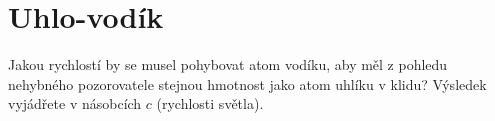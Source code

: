 \documentclass[crop=false]{standalone}
\begin{document}
\section*{Uhlo-vodík}
Jakou rychlostí by se musel pohybovat atom vodíku, aby měl z pohledu nehybného pozorovatele stejnou hmotnost jako atom uhlíku v klidu? 
Výsledek vyjádřete v násobcích $c$ (rychlosti světla).
\end{document}
